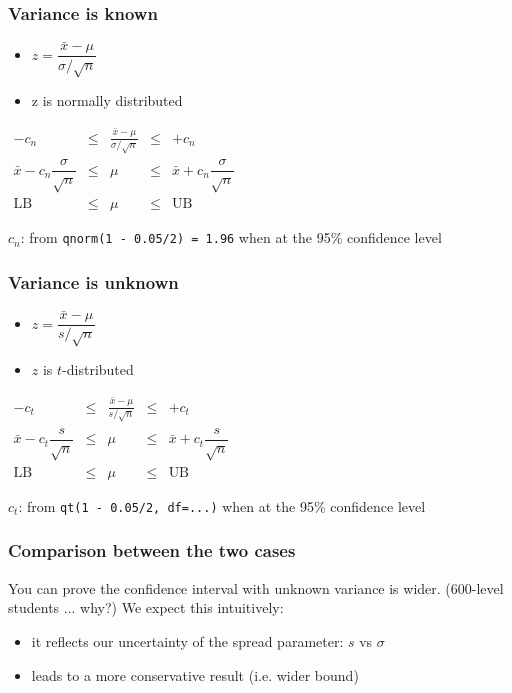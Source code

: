 \begin{frame}\frametitle{Variance is known}
	\begin{itemize}
		\item	$z = \dfrac{\bar{x} - \mu}{\sigma/\sqrt{n}}$
		\item	z is normally distributed
	\end{itemize}

	$
	\begin{array}{rcccl}
		- c_n &\leq& \displaystyle \frac{\bar{x} - \mu}{\sigma/\sqrt{n}} &\leq & +c_n\\
		\bar{x} - c_n \dfrac{\sigma}{\sqrt{n}} &\leq& \mu &\leq& \bar{x} + c_n\dfrac{\sigma}{\sqrt{n}} \\
		\text{LB} &\leq& \mu &\leq& \text{UB}
	\end{array}
	$

	$c_n$: from \texttt{qnorm(1 - 0.05/2) = 1.96} when at the 95\% confidence level
\end{frame}

\begin{frame}\frametitle{Variance is unknown}
	\begin{itemize}
		\item	$z = \dfrac{\bar{x} - \mu}{s/\sqrt{n}}$
		\item	$z$ is $t$-distributed
	\end{itemize}

	$
	\begin{array}{rcccl}
		- c_t &\leq& \displaystyle \frac{\bar{x} - \mu}{s/\sqrt{n}} &\leq & +c_t\\
		\bar{x} - c_t \dfrac{s}{\sqrt{n}} &\leq& \mu &\leq& \bar{x} + c_t\dfrac{s}{\sqrt{n}} \\
		\text{LB} &\leq& \mu &\leq& \text{UB}
	\end{array}
	$

	$c_t$: from \texttt{qt(1 - 0.05/2, df=...)} when at the 95\% confidence level
\end{frame}

\begin{frame}\frametitle{Comparison between the two cases}

	You can prove the confidence interval with unknown variance is wider. (600-level students ... why?)
	\vspace{12pt}
	We expect this intuitively:
	\begin{itemize}
		\item	it reflects our uncertainty of the spread parameter: $s$ vs $\sigma$
		\item	leads to a more conservative result (i.e. wider bound)
	\end{itemize}
\end{frame}

